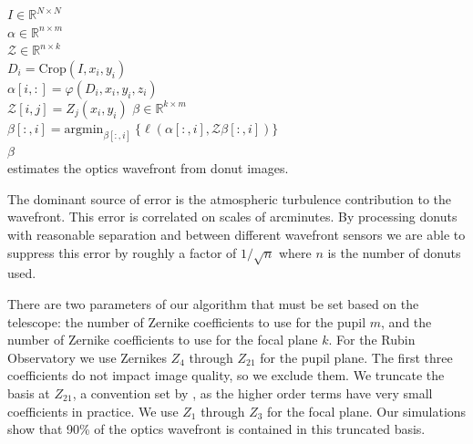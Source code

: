 \begin{algorithm}
     $I \in \mathbb{R}^{N \times N}$\\
     $\alpha \in \mathbb{R}^{n \times m}$\\
     $\mathcal{Z} \in \mathbb{R}^{n \times k}$\\
    {
        $D_i = \text{Crop}(I, x_i, y_i)$\\
        $\alpha[i,:] = \varphi(D_i, x_i, y_i, z_i)$\\
        {
        	$\mathcal{Z}[i,j] = Z_j(x_i, y_i)$
        }
    }
     $\beta \in \mathbb{R}^{k \times m}$\\
    {
      $\beta[:,i] = \text{argmin}_{\beta[:,i]}\ \{\ell(\alpha[:,i], \mathcal{Z}\beta[:,i])\}$\\
    }
     $\beta$\\
    \caption{estimates the optics wavefront from donut images.}
    \label{alg:main}
\end{algorithm}

The dominant source of error is the atmospheric turbulence contribution to the wavefront. This error is correlated on scales of arcminutes. By processing donuts with reasonable separation and between different wavefront sensors we are able to suppress this error by roughly a factor of $1 / \sqrt{n}$ where $n$ is the number of donuts used.

There are two parameters of our algorithm that must be set based on the telescope: the number of Zernike coefficients to use for the pupil $m$, and the number of Zernike coefficients to use for the focal plane $k$. For the Rubin Observatory we use Zernikes $Z_4$ through $Z_{21}$ for the pupil plane. The first three coefficients do not impact image quality, so we exclude them. We truncate the basis at $Z_{21}$, a convention set by \cite{2015Xin}, as the higher order terms have very small coefficients in practice. We use $Z_1$ through $Z_3$ for the focal plane. Our simulations show that 90\% of the optics wavefront is contained in this truncated basis.

